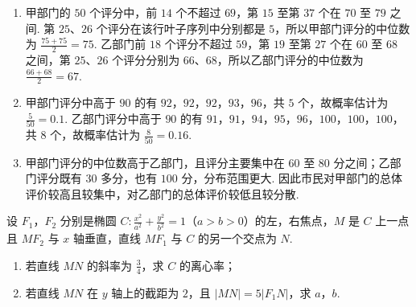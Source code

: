 \begin{solution}
\begin{enumerate}
\item 甲部门的 \(50\) 个评分中，前 \(14\) 个不超过 \(69\)，第 \(15\) 至第 \(37\) 个在 \(70\) 至 \(79\) 之间. 第 \(25\)、\(26\) 个评分在该行叶子序列中分别都是 \(5\)，所以甲部门评分的中位数为 \(\frac{75+75}{2}=75\). 乙部门前 \(18\) 个评分不超过 \(59\)，第 \(19\) 至第 \(27\) 个在 \(60\) 至 \(68\) 之间，第 \(25\)、\(26\) 个评分分别为 \(66\)、\(68\)，所以乙部门评分的中位数为 \(\frac{66+68}{2}=67\).
\item 甲部门评分中高于 \(90\) 的有 \(92\)，\(92\)，\(92\)，\(93\)，\(96\)，共 \(5\) 个，故概率估计为 \(\frac5{50}=0.1\). 乙部门评分中高于 \(90\) 的有 \(91\)，\(91\)，\(94\)，\(95\)，\(96\)，\(100\)，\(100\)，\(100\)，共 \(8\) 个，故概率估计为 \(\frac8{50}=0.16\).
\item 甲部门评分的中位数高于乙部门，且评分主要集中在 \(60\) 至 \(80\) 分之间；乙部门评分既有 \(30\) 多分，也有 \(100\) 分，分布范围更大. 因此市民对甲部门的总体评价较高且较集中，对乙部门的总体评价较低且较分散.
\end{enumerate}
\end{solution}

\begin{problem}
设 \(F_1\)，\(F_2\) 分别是椭圆 \(C:\frac{x^2}{a^2}+\frac{y^2}{b^2}=1\)（\(a>b>0\)）的左，右焦点，\(M\) 是 \(C\) 上一点且 \(MF_2\) 与 \(x\) 轴垂直，直线 \(MF_1\) 与 \(C\) 的另一个交点为 \(N\).
\begin{enumerate}
\item 若直线 \(MN\) 的斜率为 \(\frac{3}{4}\)，求 \(C\) 的离心率；
\item 若直线 \(MN\) 在 \(y\) 轴上的截距为 \(2\)，且 \(|MN|=5|F_1N|\)，求 \(a\)，\(b\).
\end{enumerate}
\end{problem}


